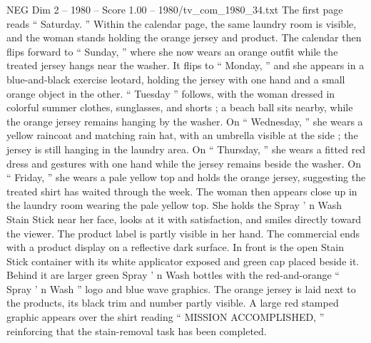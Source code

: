 \begin{textsample}{NEG Dim 2 – 1980 – Score 1.00 – 1980/tv\_com\_1980\_34.txt}
The first page reads “ Saturday. ” Within the calendar page, the same laundry room is visible, and the woman stands holding the orange jersey and product.
The calendar then flips forward to “ Sunday, ” where she now wears an orange outfit while the treated jersey hangs near the washer.
It flips to “ Monday, ” and she appears in a blue-and-black exercise leotard, holding the jersey with one hand and a small orange object in the other. “ Tuesday ” follows, with the woman dressed in colorful summer clothes, sunglasses, and shorts ; a beach ball sits nearby, while the orange jersey remains hanging by the washer.
On “ Wednesday, ” she wears a yellow raincoat and matching rain hat, with an umbrella visible at the side ; the jersey is still hanging in the laundry area.
On “ Thursday, ” she wears a fitted red dress and gestures with one hand while the jersey remains beside the washer.
On “ Friday, ” she wears a pale yellow top and holds the orange jersey, suggesting the treated shirt has waited through the week.
The woman then appears close up in the laundry room wearing the pale yellow top.
She holds the Spray ’ n Wash Stain Stick near her face, looks at it with satisfaction, and smiles directly toward the viewer.
The product label is partly visible in her hand.
The commercial ends with a product display on a reflective dark surface.
In front is the open Stain Stick container with its white applicator exposed and green cap placed beside it.
Behind it are larger green Spray ’ n Wash bottles with the red-and-orange “ Spray ’ n Wash ” logo and blue wave graphics.
The orange jersey is laid next to the products, its black trim and number partly visible.
A large red stamped graphic appears over the shirt reading “ MISSION ACCOMPLISHED, ” reinforcing that the stain-removal task has been completed.

\end{textsample}
